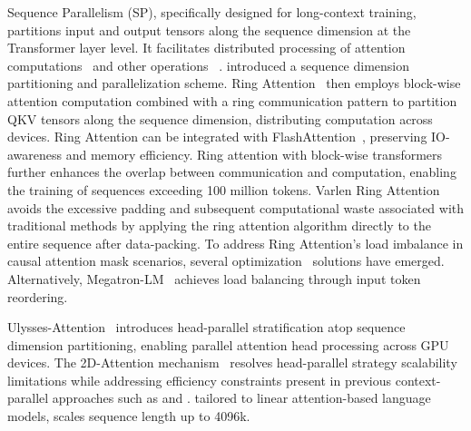 Sequence Parallelism (SP), specifically designed for long-context training, partitions input and output tensors along the sequence dimension at the Transformer layer level. It facilitates distributed processing of attention computations~\citep{li2021sequence} and other operations ~\citep{Shoeybi2019MegatronLMTM}. \citet{Bian2021ColossalAIAU} introduced a sequence dimension partitioning and parallelization scheme. Ring Attention~\citep{li2021sequence} then employs block-wise attention computation combined with a ring communication pattern to partition QKV tensors along the sequence dimension, distributing computation across devices. Ring Attention can be integrated with FlashAttention~\citep{dao2022flashattention, daoflashattention}, preserving IO-awareness and memory efficiency. Ring attention with block-wise transformers~\citep{liu2023ring} further enhances the overlap between communication and computation, enabling the training of sequences exceeding 100 million tokens. Varlen Ring Attention~\citep{minimax2025minimax01scalingfoundationmodels} avoids the excessive padding and subsequent computational waste associated with traditional methods by applying the ring attention algorithm directly to the entire sequence after data-packing. To address Ring Attention's load imbalance in causal attention mask scenarios, several optimization~\citep{Brandon2023StripedAF, li2024distflashattn, fang2024uspunifiedsequenceparallelism, gu2024loongtrain, minimax2025minimax01scalingfoundationmodels} solutions have emerged. Alternatively, Megatron-LM~\citep{Shoeybi2019MegatronLMTM} achieves load balancing through input token reordering.

Ulysses-Attention~\citep{jacobs2023deepspeed} introduces head-parallel stratification atop sequence dimension partitioning, enabling parallel attention head processing across GPU devices. The 2D-Attention mechanism~\citep{gu2024loongtrain} resolves head-parallel strategy scalability limitations while addressing efficiency constraints present in previous context-parallel approaches such as \citet{Brandon2023StripedAF} and \citet{li2024distflashattn}. \citet{sun2024linearattentionsequenceparallelism} tailored to linear attention-based language models, scales sequence length up to 4096k.

